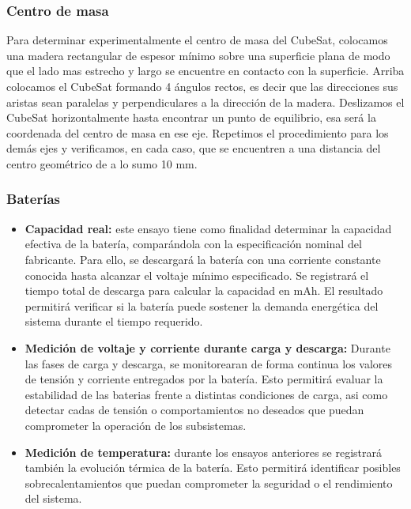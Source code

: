     \subsubsection{Centro de masa}
      Para determinar experimentalmente el centro de masa del CubeSat, colocamos una madera rectangular de espesor
      mínimo sobre una superficie plana de modo que el lado mas estrecho y largo se encuentre en contacto con la
      superficie. Arriba colocamos el CubeSat formando 4 ángulos rectos, es decir que las direcciones sus aristas sean
      paralelas y perpendiculares a la dirección de la madera. Deslizamos el CubeSat horizontalmente hasta encontrar un
      punto de equilibrio, esa será la coordenada del centro de masa en ese eje. Repetimos el procedimiento para los
      demás ejes y verificamos, en cada caso, que se encuentren a una distancia del centro geométrico de a lo sumo 10
      mm.

    \subsubsection{Baterías}
      \begin{itemize}
        \item \textbf{Capacidad real:} este ensayo tiene como finalidad determinar la capacidad efectiva de la batería,
          comparándola con la especificación nominal del fabricante. Para ello, se descargará la batería con una
          corriente constante conocida hasta alcanzar el voltaje mínimo especificado. Se registrará el tiempo total de
          descarga para calcular la capacidad en mAh.  El resultado permitirá verificar si la batería puede sostener la
          demanda energética del sistema durante el tiempo requerido.

        \item \textbf{Medición de voltaje y corriente durante carga y descarga:} Durante las fases de carga y descarga,
          se monitorearan de forma continua los valores de tensión y corriente entregados por la batería. Esto permitirá
          evaluar la estabilidad de las baterias frente a distintas condiciones de carga, asi como detectar cadas de tensión
          o comportamientos no deseados que puedan comprometer la operación de los subsistemas.

        \item \textbf{Medición de temperatura:} durante los ensayos anteriores se registrará también la evolución
          térmica de la batería. Esto permitirá identificar posibles sobrecalentamientos que puedan comprometer la
          seguridad o el rendimiento del sistema.
      \end{itemize}

